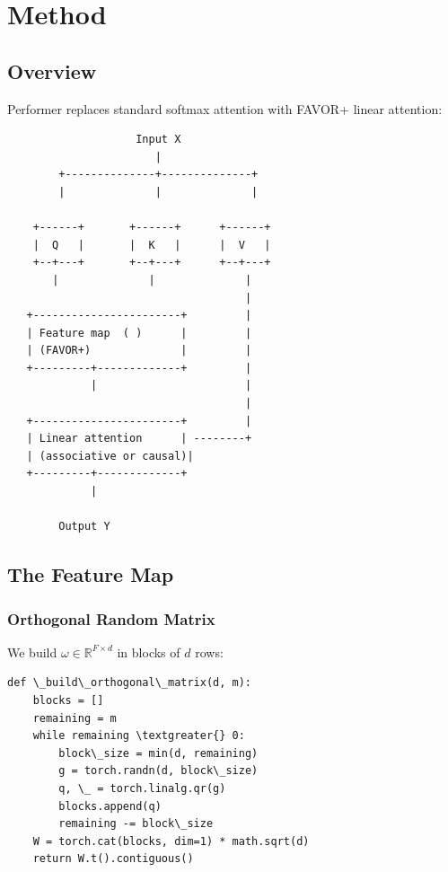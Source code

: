 
\section{Method}

\subsection{Overview}

Performer replaces standard softmax attention with FAVOR+ linear attention:

\begin{lstlisting}
                    Input X
                       |
        +--------------+--------------+
        |              |              |
                                       
    +------+       +------+      +------+
    |  Q   |       |  K   |      |  V   |
    +--+---+       +--+---+      +--+---+
       |              |              |
                                     |
   +-----------------------+         |
   | Feature map  ( )      |         |
   | (FAVOR+)              |         |
   +---------+-------------+         |
             |                       |
                                     |
   +-----------------------+         |
   | Linear attention      | --------+
   | (associative or causal)|
   +---------+-------------+
             |
              
        Output Y
\end{lstlisting}

\subsection{The Feature Map}

\subsubsection{Orthogonal Random Matrix}

We build $\omega \in \mathbb{R}^{F \times d}$ in blocks of $d$ rows:

\begin{lstlisting}
def \_build\_orthogonal\_matrix(d, m):
    blocks = []
    remaining = m
    while remaining \textgreater{} 0:
        block\_size = min(d, remaining)
        g = torch.randn(d, block\_size)
        q, \_ = torch.linalg.qr(g)
        blocks.append(q)
        remaining -= block\_size
    W = torch.cat(blocks, dim=1) * math.sqrt(d)
    return W.t().contiguous()
\end{lstlisting}

